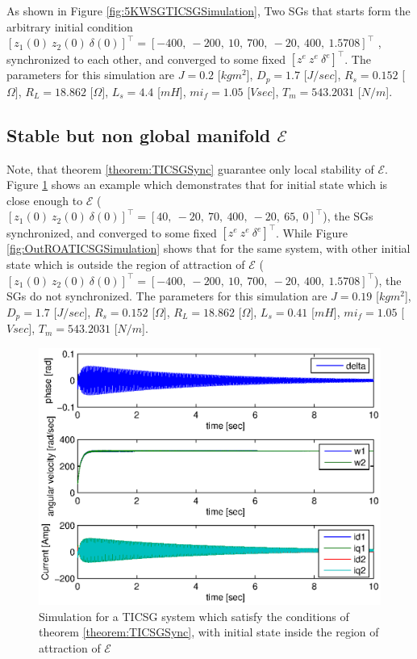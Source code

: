 \documentclass[letterpaper, 10 pt, conference]{ieeeconf}
\begin{document}
As shown in Figure \ref{fig:5KWSGTICSGSimulation}, Two SGs that starts form the arbitrary initial condition 
$\left[z_1(0)\ z_2(0) \ \delta(0) \right]^\top = \left[ -400, \  -200,  \  10, \   700, \ -20, \  400, \ 1.5708 \right]^\top$
, synchronized to each other, and converged to some fixed $\left[z^e\ z^e \ \delta^e \right]^\top$. The parameters for this
simulation are $J=0.2$ {[}$kgm^{2}${]}, $D_{p}=1.7$ {[}$J/sec${]},
$R_{s}=0.152$ {[}$\Omega]$,
$R_{L}=18.862$ {[}$\Omega]$, $L_{s}=4.4$ {[}$mH${]}, $mi_{f}=1.05$
{[}$Vsec]$, $T_{m}=543.2031$ {[}$N/m${]}.
\subsection{Stable  but non global manifold $\mathscr{E}$}
Note, that theorem \ref{theorem:TICSGSync} guarantee only local stability of $\mathscr{E}$. Figure \ref{fig:InROATICSGSimulation} shows an example which demonstrates that for initial state which is close enough to $\mathscr{E}$ ($\left[z_1(0)\ z_2(0) \ \delta(0) \right]^\top = \left[ 40, \  -20, \  70, \   400, \ -20, \  65, \ 0 \right]^\top$), the SGs synchronized, and converged to some fixed $\left[z^e\ z^e \ \delta^e \right]^\top$. While Figure \ref{fig:OutROATICSGSimulation} shows that for the same system, with other initial state which is outside the region of attraction of  $\mathscr{E}$ ($\left[z_1(0)\ z_2(0) \ \delta(0) \right]^\top = \left[ -400, \  -200,  \  10, \   700, \ -20, \  400, \ 1.5708 \right]^\top$), the SGs do not synchronized. The parameters for this
simulation are $J=0.19$ {[}$kgm^{2}${]}, $D_{p}=1.7$ {[}$J/sec${]},
$R_{s}=0.152$ {[}$\Omega]$,
$R_{L}=18.862$ {[}$\Omega]$, $L_{s}=0.41$ {[}$mH${]}, $mi_{f}=1.05$
{[}$Vsec]$, $T_{m}=543.2031$ {[}$N/m${]}.
\begin{figure}[ht]
\includegraphics[scale=0.65]{InROATICSGSimulation}

\caption{Simulation for a TICSG system which satisfy the conditions of theorem \ref{theorem:TICSGSync}, with initial state inside the region of attraction of $\mathscr{E}$}
\label{fig:InROATICSGSimulation}
\end{figure}
\end{document}
